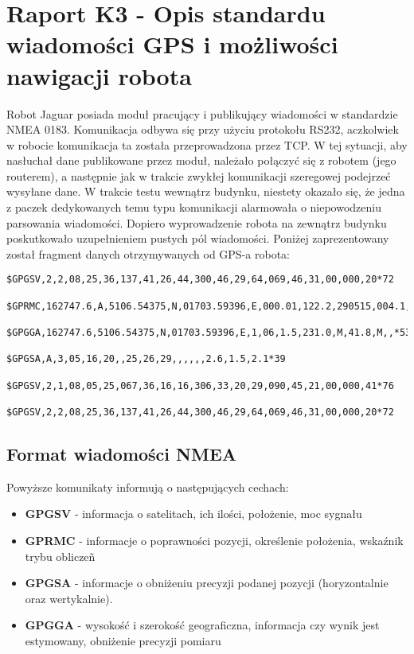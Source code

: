 \section{Raport K3 - Opis standardu wiadomości GPS i możliwości nawigacji robota}
Robot Jaguar posiada moduł pracujący i publikujący wiadomości w standardzie NMEA 0183. Komunikacja odbywa się przy użyciu protokołu RS232, aczkolwiek w robocie komunikacja ta została przeprowadzona przez TCP. W tej sytuacji, aby nasłuchał dane publikowane przez moduł, należało połączyć się z robotem (jego routerem), a następnie jak w trakcie zwykłej komunikacji szeregowej podejrzeć wysyłane dane. W trakcie testu wewnątrz budynku, niestety okazało się, że jedna z paczek dedykowanych temu typu komunikacji alarmowała o niepowodzeniu parsowania wiadomości. Dopiero wyprowadzenie robota na zewnątrz budynku poskutkowało uzupełnieniem pustych pól wiadomości. Poniżej zaprezentowany został fragment danych otrzymywanych od GPS-a robota:
\begin{verbatim}
$GPGSV,2,2,08,25,36,137,41,26,44,300,46,29,64,069,46,31,00,000,20*72

$GPRMC,162747.6,A,5106.54375,N,01703.59396,E,000.01,122.2,290515,004.1,E*55

$GPGGA,162747.6,5106.54375,N,01703.59396,E,1,06,1.5,231.0,M,41.8,M,,*53

$GPGSA,A,3,05,16,20,,25,26,29,,,,,,2.6,1.5,2.1*39

$GPGSV,2,1,08,05,25,067,36,16,16,306,33,20,29,090,45,21,00,000,41*76

$GPGSV,2,2,08,25,36,137,41,26,44,300,46,29,64,069,46,31,00,000,20*72
\end{verbatim}

\subsection{Format wiadomości NMEA}
Powyższe komunikaty informują o następujących cechach:
\begin{itemize}
\item \textbf{GPGSV} - informacja o satelitach, ich ilości, położenie, moc sygnału
\item \textbf{GPRMC} - informacje o poprawności pozycji, określenie położenia, wskaźnik trybu obliczeñ
\item \textbf{GPGSA} - informacje o obniżeniu precyzji podanej pozycji (horyzontalnie oraz wertykalnie).
\item \textbf{GPGGA} - wysokość i szerokość geograficzna, informacja czy wynik jest estymowany, obniżenie precyzji pomiaru
\end{itemize}


